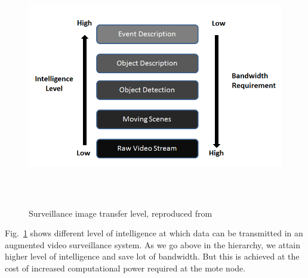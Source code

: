 \begin{figure}[!b]
\centering
\includegraphics[height=300pt]{Figures/image_tr_level}
\caption{Surveillance image transfer level, reproduced from~\cite{3}}
\label{image_tr_level}
\end{figure}
\indent Fig.~\ref{image_tr_level} shows different level of
intelligence at which data can be transmitted in an augmented video
surveillance system. As we go above in the hierarchy, we attain higher
level of intelligence and save lot of bandwidth. But this is achieved at
the cost of increased computational power required at the mote node.
